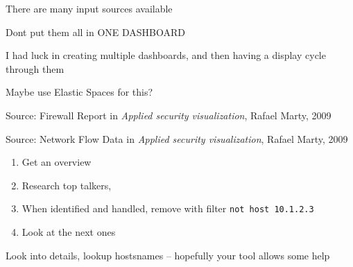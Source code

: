 \documentclass[Screen16to9,17pt]{foils}
\begin{document}
\begin{list2}
\item There are many input sources available
\item Dont put them all in ONE DASHBOARD
\item I had luck in creating multiple dashboards, and then having a display cycle through them
\item Maybe use Elastic Spaces for this? 
\end{list2}





Source: Firewall Report in \emph{Applied security visualization}, Rafael Marty, 2009




Source: Network Flow Data in \emph{Applied security visualization}, Rafael Marty, 2009





\begin{quote}

\end{quote}

\begin{enumerate}
\item Get an overview
\item Research top talkers,
\item When identified and handled, remove with filter \verb+not host 10.1.2.3+
\item Look at the next ones
\end{enumerate}

Look into details, lookup hostsnames -- hopefully your tool allows some help




\end{document}
